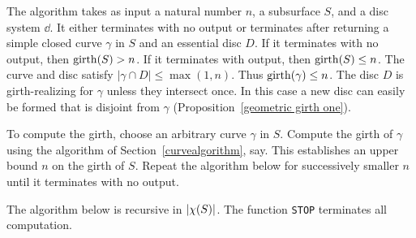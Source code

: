 The algorithm takes as input a natural number $n$, a subsurface $S$,
and a disc system $\dd$.  It either terminates with no output or 
terminates after returning a simple closed curve $\gamma$ in $S$ and 
an essential disc $D$.  If it terminates with no output, then $\operatorname{girth}(S)>n$.
If it terminates with output, then $\operatorname{girth}(S)\leq n$.  The curve and disc 
satisfy $|\gamma\cap D|\leq\max(1,n)$.
Thus $\operatorname{girth}(\gamma)\leq n$.  The disc $D$ is girth-realizing for 
$\gamma$ unless they intersect once.
In this case a new disc can easily be formed that is disjoint from
$\gamma$ (Proposition~\ref{geometric girth one}).

To compute the girth, choose an arbitrary curve $\gamma$ in $S$.  
Compute the girth of $\gamma$ using the algorithm of 
Section~\ref{curvealgorithm}, say.  This establishes an upper bound
$n$ on the girth of $S$.  Repeat the algorithm below for successively
smaller $n$ until it terminates with no output.

The algorithm below is recursive in $| \chi (S) |$.  
The function \texttt{STOP} terminates all computation.


\bigskip

